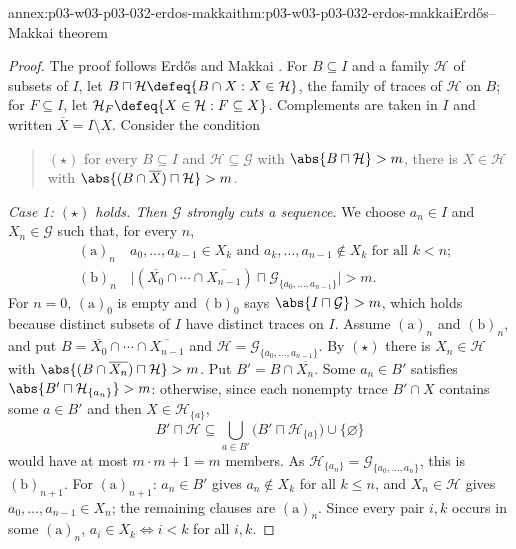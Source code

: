 \begin{annexitem}{annex:p03-w03-p03-032-erdos-makkai}{thm:p03-w03-p03-032-erdos-makkai}{Erd\H{o}s--Makkai theorem}
\begin{proof}
The proof follows Erd\H{o}s and Makkai \cite[Theorem, cases (i) and
(ii)]{ErdosMakkai1966}.  For \(B\subseteq I\) and a family
\(\mathcal H\) of subsets of \(I\), let
\(B\sqcap\mathcal H\defeq\{B\cap X:X\in\mathcal H\}\), the family of traces
of \(\mathcal H\) on \(B\); for \(F\subseteq I\), let
\(\mathcal H_F\defeq\{X\in\mathcal H:F\subseteq X\}\).  Complements are
taken in \(I\) and written \(\overline X=I\setminus X\).  Consider the
condition
\begin{quote}
\((\star)\) for every \(B\subseteq I\) and \(\mathcal H\subseteq\mathcal G\)
with \(\abs{B\sqcap\mathcal H}>m\), there is \(X\in\mathcal H\) with
\(\abs{(B\cap\overline X)\sqcap\mathcal H}>m\).
\end{quote}

\emph{Case 1: \((\star)\) holds.  Then \(\mathcal G\) strongly cuts a
sequence.}  We choose \(a_n\in I\) and \(X_n\in\mathcal G\) such that, for
every \(n\),
\begin{align*}
  &(\mathrm a)_n\quad a_0,\ldots,a_{k-1}\in X_k\text{ and }
     a_k,\ldots,a_{n-1}\notin X_k\text{ for all }k<n;\\
  &(\mathrm b)_n\quad
     \bigl\lvert(\overline{X_0}\cap\cdots\cap\overline{X_{n-1}})\sqcap
     \mathcal G_{\{a_0,\ldots,a_{n-1}\}}\bigr\rvert>m .
\end{align*}
For \(n=0\), \((\mathrm a)_0\) is empty and \((\mathrm b)_0\) says
\(\abs{I\sqcap\mathcal G}>m\), which holds because distinct subsets of \(I\)
have distinct traces on \(I\).  Assume \((\mathrm a)_n\) and
\((\mathrm b)_n\), and put
\(B=\overline{X_0}\cap\cdots\cap\overline{X_{n-1}}\) and
\(\mathcal H=\mathcal G_{\{a_0,\ldots,a_{n-1}\}}\).  By \((\star)\) there is
\(X_n\in\mathcal H\) with
\(\abs{(B\cap\overline{X_n})\sqcap\mathcal H}>m\).  Put
\(B'=B\cap\overline{X_n}\).  Some \(a_n\in B'\) satisfies
\(\abs{B'\sqcap\mathcal H_{\{a_n\}}}>m\): otherwise, since each nonempty
trace \(B'\cap X\) contains some \(a\in B'\) and then
\(X\in\mathcal H_{\{a\}}\),
\[
  B'\sqcap\mathcal H\subseteq
  \bigcup_{a\in B'}\bigl(B'\sqcap\mathcal H_{\{a\}}\bigr)\cup\{\varnothing\}
\]
would have at most \(m\cdot m+1=m\) members.  As
\(\mathcal H_{\{a_n\}}=\mathcal G_{\{a_0,\ldots,a_n\}}\), this is
\((\mathrm b)_{n+1}\).  For \((\mathrm a)_{n+1}\): \(a_n\in B'\) gives
\(a_n\notin X_k\) for all \(k\leq n\), and \(X_n\in\mathcal H\) gives
\(a_0,\ldots,a_{n-1}\in X_n\); the remaining clauses are \((\mathrm a)_n\).
Since every pair \(i,k\) occurs in some \((\mathrm a)_n\),
\(a_i\in X_k\Leftrightarrow i<k\) for all \(i,k\).


\end{proof}
\end{annexitem}

